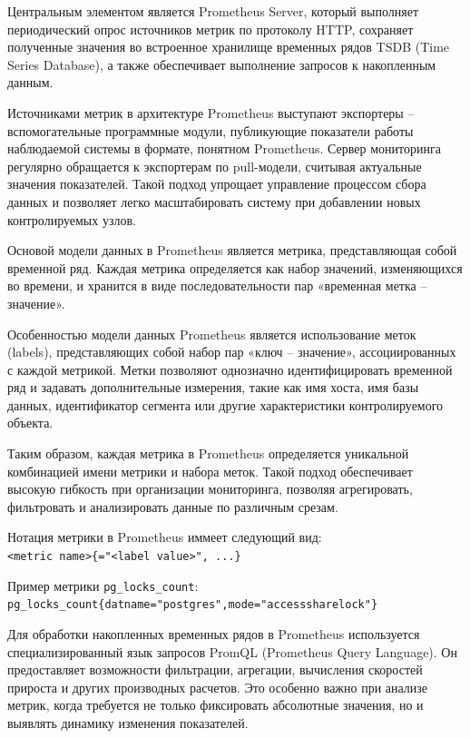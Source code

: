 Центральным элементом является Prometheus Server, который выполняет периодический опрос источников метрик по протоколу HTTP, сохраняет полученные значения во встроенное хранилище временных рядов TSDB (Time Series Database), а также обеспечивает выполнение запросов к накопленным данным.

Источниками метрик в архитектуре Prometheus выступают экспортеры -- вспомогательные программные модули, публикующие показатели работы наблюдаемой системы в формате, понятном Prometheus. Сервер мониторинга регулярно обращается к экспортерам по pull-модели, считывая актуальные значения показателей. Такой подход упрощает управление процессом сбора данных и позволяет легко масштабировать систему при добавлении новых контролируемых узлов.

Основой модели данных в Prometheus является метрика, представляющая собой временной ряд. Каждая метрика определяется как набор значений, изменяющихся во времени, и хранится в виде последовательности пар «временная метка -- значение».

Особенностью модели данных Prometheus является использование меток (labels), представляющих собой набор пар «ключ -- значение», ассоциированных с каждой метрикой. Метки позволяют однозначно идентифицировать временной ряд и задавать дополнительные измерения, такие как имя хоста, имя базы данных, идентификатор сегмента или другие характеристики контролируемого объекта.

Таким образом, каждая метрика в Prometheus определяется уникальной комбинацией имени метрики и набора меток. Такой подход обеспечивает высокую гибкость при организации мониторинга, позволяя агрегировать, фильтровать и анализировать данные по различным срезам.

Нотация метрики в Prometheus иммеет следующий вид:\\
 \texttt{<metric name>\{<label name>="<label value>", ...\}} 
 
Пример метрики \texttt{pg\_locks\_count}:\\
\texttt{pg\_locks\_count\{datname="postgres",mode="accesssharelock"\}} 

Для обработки накопленных временных рядов в Prometheus используется специализированный язык запросов PromQL (Prometheus Query Language). Он предоставляет возможности фильтрации, агрегации, вычисления скоростей прироста и других производных расчетов. Это особенно важно при анализе метрик, когда требуется не только фиксировать абсолютные значения, но и выявлять динамику изменения показателей.




